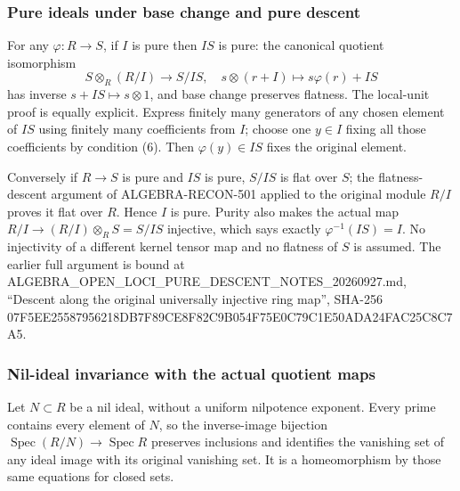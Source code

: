 \subsubsection{Pure ideals under base change and pure descent}\label{algebra-proof-022-pure-ideals-under-base-change-and-pure-descent}

For any \(\varphi:R\to S\), if \(I\) is pure then \(IS\) is pure: the canonical quotient isomorphism \[
S\otimes_R(R/I)\longrightarrow S/IS,\quad
s\otimes(r+I)\longmapsto s\varphi(r)+IS
\] has inverse \(s+IS\mapsto s\otimes1\), and base change preserves flatness. The local-unit proof is equally explicit. Express finitely many generators of any chosen element of \(IS\) using finitely many coefficients from \(I\); choose one \(y\in I\) fixing all those coefficients by condition (6). Then \(\varphi(y)\in IS\) fixes the original element.

Conversely if \(R\to S\) is pure and \(IS\) is pure, \(S/IS\) is flat over \(S\); the flatness-descent argument of ALGEBRA-RECON-501 applied to the original module \(R/I\) proves it flat over \(R\). Hence \(I\) is pure. Purity also makes the actual map \(R/I\to (R/I)\otimes_RS=S/IS\) injective, which says exactly \(\varphi^{-1}(IS)=I\). No injectivity of a different kernel tensor map and no flatness of \(S\) is assumed. The earlier full argument is bound at ALGEBRA\_\allowbreak{}OPEN\_\allowbreak{}LOCI\_\allowbreak{}PURE\_\allowbreak{}DESCENT\_\allowbreak{}NOTES\_\allowbreak{}20260927.\allowbreak{}md, ``Descent along the original universally injective ring map'', SHA-256 07F5\allowbreak{}EE25\allowbreak{}5879\allowbreak{}5621\allowbreak{}8DB7\allowbreak{}F89C\allowbreak{}E8F8\allowbreak{}2C9B\allowbreak{}054F\allowbreak{}75E0\allowbreak{}C79C\allowbreak{}1E50\allowbreak{}ADA2\allowbreak{}4FAC\allowbreak{}25C8\allowbreak{}C7A5.

\subsubsection{Nil-ideal invariance with the actual quotient maps}\label{algebra-proof-022-nil-ideal-invariance-with-the-actual-quotient-maps}

Let \(N\subset R\) be a nil ideal, without a uniform nilpotence exponent. Every prime contains every element of \(N\), so the inverse-image bijection \(\operatorname{Spec}(R/N)\to\operatorname{Spec}R\) preserves inclusions and identifies the vanishing set of any ideal image with its original vanishing set. It is a homeomorphism by those same equations for closed sets.

